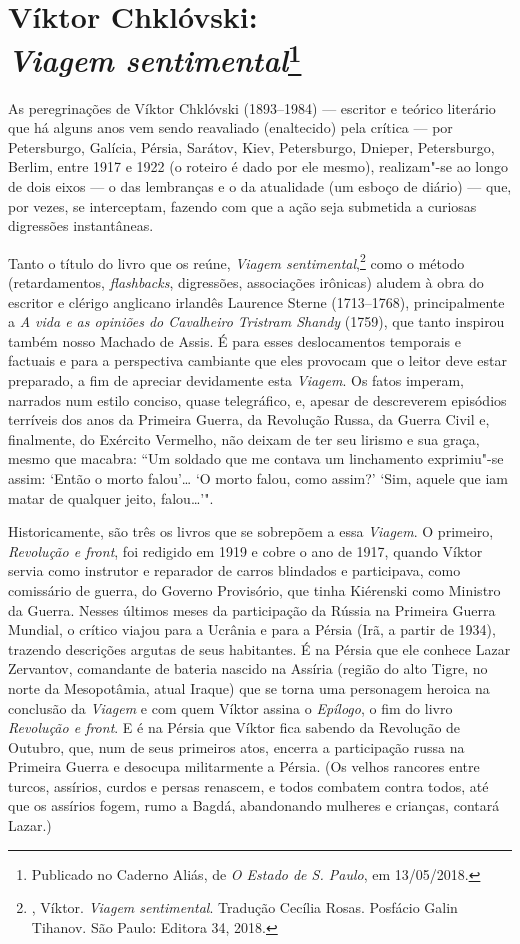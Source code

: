 \chapter{Víktor Chklóvski:\\ \emph{Viagem sentimental}\footnote{Publicado no Caderno Aliás,
de \emph{O Estado de S. Paulo}, em 13/05/2018.}}
\label{sentimental}

As peregrinações de Víktor Chklóvski (1893--1984) --- escritor e
teórico literário que há alguns anos vem sendo reavaliado
(enaltecido) pela crítica --- por Petersburgo, Galícia, Pérsia,
Sarátov, Kiev, Petersburgo, Dnieper, Petersburgo, Berlim, entre
1917 e 1922 (o roteiro é dado por ele mesmo), realizam"-se ao
longo de dois eixos --- o das lembranças e o da atualidade (um
esboço de diário) --- que, por vezes, se interceptam, fazendo com
que a ação seja submetida a curiosas digressões instantâneas.

Tanto o título do livro que os reúne, \emph{Viagem
sentimental},\footnote{, Víktor. \emph{Viagem
sentimental}. Tradução Cecília Rosas. Posfácio Galin Tihanov. São
Paulo: Editora 34, 2018.} como o método (retardamentos,
\emph{flashbacks}, digressões, associações irônicas) aludem à
obra do escritor e clérigo anglicano irlandês Laurence Sterne
(1713--1768), principalmente a \emph{A vida e as opiniões do
Cavalheiro Tristram Shandy} (1759), que tanto inspirou também
nosso Machado de Assis. É para esses deslocamentos temporais e
factuais e para a perspectiva cambiante que eles provocam que o
leitor deve estar preparado, a fim de apreciar devidamente esta
\emph{Viagem}. Os fatos imperam, narrados num estilo conciso,
quase telegráfico, e, apesar de descreverem episódios terríveis
dos anos da Primeira Guerra, da Revolução Russa, da Guerra
Civil e, finalmente, do Exército Vermelho, não deixam de ter seu
lirismo e sua graça, mesmo que macabra: ``Um soldado que me
contava um linchamento exprimiu"-se assim: `Então o morto
falou'\ldots{} `O morto falou, como assim?' `Sim, aquele que iam
matar de qualquer jeito, falou\ldots{}'".

Historicamente, são três os livros que se sobrepõem a essa
\emph{Viagem}. O primeiro, \emph{Revolução e front}, foi
redigido em 1919 e cobre o ano de 1917, quando Víktor servia
como instrutor e reparador de carros blindados e participava,
como comissário de guerra, do Governo Provisório, que tinha
Kiérenski como Ministro da Guerra. Nesses últimos meses da
participação da Rússia na Primeira Guerra Mundial, o crítico
viajou para a Ucrânia e para a Pérsia (Irã, a partir de 1934),
trazendo descrições argutas de seus habitantes. É na Pérsia que
ele conhece Lazar Zervantov, comandante de bateria nascido na
Assíria (região do alto Tigre, no norte da Mesopotâmia, atual
Iraque) que se torna uma personagem heroica na conclusão da
\emph{Viagem} e com quem Víktor assina o \emph{Epílogo}, o fim
do livro \emph{Revolução e front}. E é na Pérsia que Víktor fica
sabendo da Revolução de Outubro, que, num de seus primeiros atos,
encerra a participação russa na Primeira Guerra e desocupa
militarmente a Pérsia. (Os velhos rancores entre turcos, assírios,
curdos e persas renascem, e todos combatem contra todos, até
que os assírios fogem, rumo a Bagdá, abandonando mulheres e
crianças, contará Lazar.)

